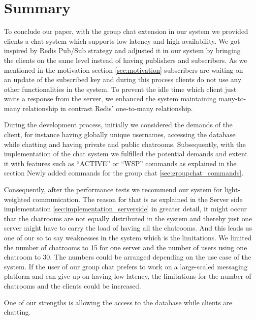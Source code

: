 \section{Summary}
\label{sec:summary}

To conclude our paper, with the group chat extension in our system we provided clients a chat system which supports low latency and high availability. We got inspired by Redis Pub/Sub strategy and adjusted it in our system by bringing the clients on the same level instead of having publishers and subscribers. As we mentioned in the motivation section \ref{sec:motivation} subscribers are waiting on an update of the subscribed key and during this process clients do not use any other functionalities in the system. To prevent the idle time which client just waits a response from the server, we enhanced the system maintaining many-to-many relationship in contrast Redis’ one-to-many relationship.

During the development process, initially we considered the demands of the client, for instance having globally unique usernames, accessing the database while chatting and having private and public chatrooms. Subsequently, with the implementation of the chat system we fulfilled the potential demands and extent it with features such as “ACTIVE” or “WSP” commands as explained in the section Newly added commands for the group chat \ref{sec:groupchat_commands}.

Consequently, after the performance tests we recommend our system for light-weighted communication. The reason for that is as explained in the Server side implementation \ref{sec:implementation_serverside} in greater detail, it might occur that the chatrooms are not equally distributed in the system and thereby just one server might have to carry the load of having all the chatrooms. And this leads us one of our so to say weaknesses in the system which is the limitations. We limited the number of chatrooms to 15 for one server and the number of users using one chatroom to 30. The numbers could be arranged depending on the use case of the system. If the user of our group chat prefers to work on a large-scaled messaging platform and can give up on having low latency, the limitations for the number of chatrooms and the clients could be increased.

One of our strengths is allowing the access to the database while clients are chatting.


